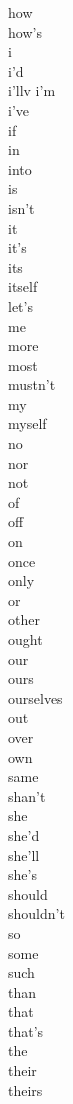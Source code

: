 \begin{appendices}
\begin{multicols}{7}
how\\
how's\\
i\\
i'd\\
i'llv
i'm\\
i've\\
if\\
in\\
into\\
is\\
isn't\\
it\\
it's\\
its\\
itself\\
let's\\
me\\
more\\
most\\
mustn't\\
my\\
myself\\
no\\
nor\\
not\\
of\\
off\\
on\\
once\\
only\\
or\\
other\\
ought\\
our\\
ours\\
ourselves\\
out\\
over\\
own\\
same\\
shan't\\
she\\
she'd\\
she'll\\
she's\\
should\\
shouldn't\\
so\\
some\\
such\\
than\\
that\\
that's\\
the\\
their\\
theirs\\

\end{multicols}
\end{appendices}
